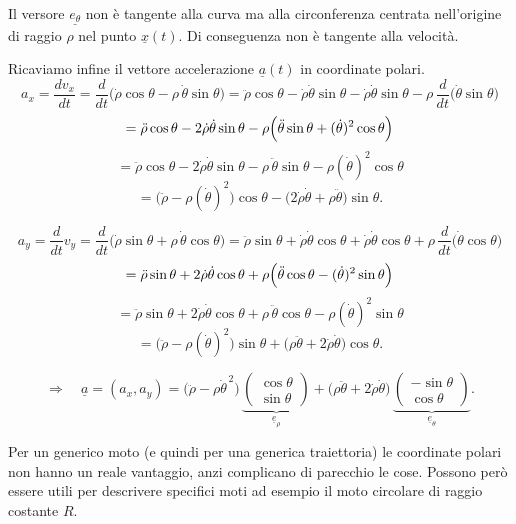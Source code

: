 \begin{oss}{}
    Il versore $\underline{e_\theta}$ non è tangente alla curva ma alla circonferenza centrata nell'origine di raggio $\rho$ nel punto $\underline{x}(t)$. Di conseguenza non è tangente alla velocità.
\end{oss}
Ricaviamo infine il vettore accelerazione $\underline{a}(t)$ in coordinate polari.
\[
a_x=\frac{dv_x}{dt}
=\frac{d}{dt}\bigl(\dot{\rho}\cos\theta-\rho\,\dot{\theta}\sin\theta\bigr)
=\ddot{\rho}\cos\theta-\dot{\rho}\dot{\theta}\sin\theta-\dot{\rho}\dot{\theta}\sin\theta
-\rho\,\frac{d}{dt}\bigl(\dot{\theta}\sin\theta\bigr)
\]
\[
=\ddot{\rho}\cos\theta-2\dot{\rho}\dot{\theta}\sin\theta
-\rho\Bigl(\ddot{\theta}\sin\theta+(\dot{\theta})^2\cos\theta\Bigr)
\]
\[
=\ddot{\rho}\cos\theta-2\dot{\rho}\dot{\theta}\sin\theta-\rho\,\ddot{\theta}\sin\theta-\rho(\dot{\theta})^2\cos\theta
\]
\[
=\bigl(\ddot{\rho}-\rho(\dot{\theta})^2\bigr)\cos\theta-\bigl(2\dot{\rho}\dot{\theta}+\rho\ddot{\theta}\bigr)\sin\theta.
\]

\[
a_y=\frac{d}{dt}v_y
=\frac{d}{dt}\bigl(\dot{\rho}\sin\theta+\rho\,\dot{\theta}\cos\theta\bigr)
=\ddot{\rho}\sin\theta+\dot{\rho}\dot{\theta}\cos\theta+\dot{\rho}\dot{\theta}\cos\theta
+\rho\,\frac{d}{dt}\bigl(\dot{\theta}\cos\theta\bigr)
\]
\[
=\ddot{\rho}\sin\theta+2\dot{\rho}\dot{\theta}\cos\theta
+\rho\Bigl(\ddot{\theta}\cos\theta-(\dot{\theta})^2\sin\theta\Bigr)
\]
\[
=\ddot{\rho}\sin\theta+2\dot{\rho}\dot{\theta}\cos\theta+\rho\,\ddot{\theta}\cos\theta-\rho(\dot{\theta})^2\sin\theta
\]
\[
=\bigl(\ddot{\rho}-\rho(\dot{\theta})^2\bigr)\sin\theta+\bigl(\rho\ddot{\theta}+2\dot{\rho}\dot{\theta}\bigr)\cos\theta.
\]

\[
\Rightarrow\quad
\underline{a}=(a_x,a_y)
=\bigl(\ddot{\rho}-\rho\dot{\theta}^{\,2}\bigr)\,
\underbrace{\begin{pmatrix}\cos\theta\\ \sin\theta\end{pmatrix}}_{\underline{e}_{\rho}}
+\bigl(\rho\ddot{\theta}+2\dot{\rho}\dot{\theta}\bigr)\,
\underbrace{\begin{pmatrix}-\sin\theta\\ \cos\theta\end{pmatrix}}_{\underline{e}_{\theta}}.
\]

Per un generico moto (e quindi per una generica traiettoria) le coordinate polari non hanno un reale vantaggio, anzi complicano di parecchio le cose. Possono però essere utili per descrivere specifici moti ad esempio il moto circolare di raggio costante $R$.

